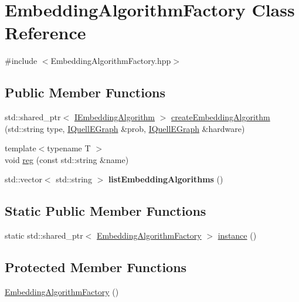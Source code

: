 \hypertarget{a00053}{}\section{Embedding\+Algorithm\+Factory Class Reference}
\label{a00053}


{\ttfamily \#include $<$Embedding\+Algorithm\+Factory.\+hpp$>$}

\subsection*{Public Member Functions}
\begin{DoxyCompactItemize}
\item 
std\+::shared\+\_\+ptr$<$ \hyperlink{a00071}{I\+Embedding\+Algorithm} $>$ \hyperlink{a00053_a19e9ec2636073705e65c1039c8879be7}{create\+Embedding\+Algorithm} (std\+::string type, \hyperlink{a00076}{I\+Quell\+E\+Graph} \&prob, \hyperlink{a00076}{I\+Quell\+E\+Graph} \&hardware)
\item 
{\footnotesize template$<$typename T $>$ }\\void \hyperlink{a00053_aec39e8d4edc3715f3980db5d13252f3b}{reg} (const std\+::string \&name)
\item 
std\+::vector$<$ std\+::string $>$ {\bfseries list\+Embedding\+Algorithms} ()\hypertarget{a00053_ab19e4f507f0ac05a0b37ae75c68b6df4}{}\label{a00053_ab19e4f507f0ac05a0b37ae75c68b6df4}

\end{DoxyCompactItemize}
\subsection*{Static Public Member Functions}
\begin{DoxyCompactItemize}
\item 
static std\+::shared\+\_\+ptr$<$ \hyperlink{a00053}{Embedding\+Algorithm\+Factory} $>$ \hyperlink{a00053_a1fccee9971df2df4870cd1333798b3da}{instance} ()
\end{DoxyCompactItemize}
\subsection*{Protected Member Functions}
\begin{DoxyCompactItemize}
\item 
\hyperlink{a00053_ac19af2c293caa47ea46a0122f3e81e28}{Embedding\+Algorithm\+Factory} ()
\end{DoxyCompactItemize}
